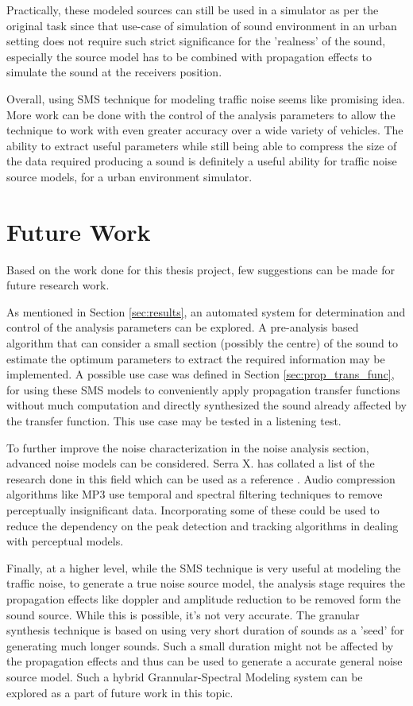 Practically, these modeled sources can still be used in a simulator as per the original task since that use-case of simulation of sound environment in an urban setting does not require such strict significance for the 'realness' of the sound, especially the source model has to be combined with propagation effects to simulate the sound at the receivers position.

Overall, using SMS technique for modeling traffic noise seems like promising idea. More work can be done with the control of the analysis parameters to allow the technique to work with even greater accuracy over a wide variety of vehicles. The ability to extract useful parameters while still being able to compress the size of the data required producing a sound is definitely a useful ability for traffic noise source models, for a urban environment simulator.

\section{Future Work}
Based on the work done for this thesis project, few suggestions can be made for future research work. 

As mentioned in Section \ref{sec:results}, an automated system for determination and control of the analysis parameters can be explored. A pre-analysis based algorithm that can consider a small section (possibly the centre) of the sound to estimate the optimum parameters to extract the required information may be implemented. A possible use case was defined in Section \ref{sec:prop_trans_func}, for using these SMS models to conveniently apply propagation transfer functions without much computation and directly synthesized the sound already affected by the transfer function. This use case may be tested in a listening test.

To further improve the noise characterization in the noise analysis section, advanced noise models can be considered. Serra X. has collated a list of the research done in this field which can be used as a reference \cite{ref:smsAdv}. Audio compression algorithms like MP3 use temporal and spectral filtering techniques to remove perceptually insignificant data. Incorporating some of these could be used to reduce the dependency on the peak detection and tracking algorithms in dealing with perceptual models.

Finally, at a higher level, while the SMS technique is very useful at modeling the traffic noise, to generate a true noise source model, the analysis stage requires the propagation effects like doppler and amplitude reduction to be removed form the sound source. While this is possible, it's not very accurate. The granular synthesis technique is based on using very short duration of sounds as a 'seed' for generating much longer sounds. Such a small duration might not be affected by the propagation effects and thus can be used to generate a accurate general noise source model. Such a hybrid Grannular-Spectral Modeling system can be explored as a part of future work in this topic.
